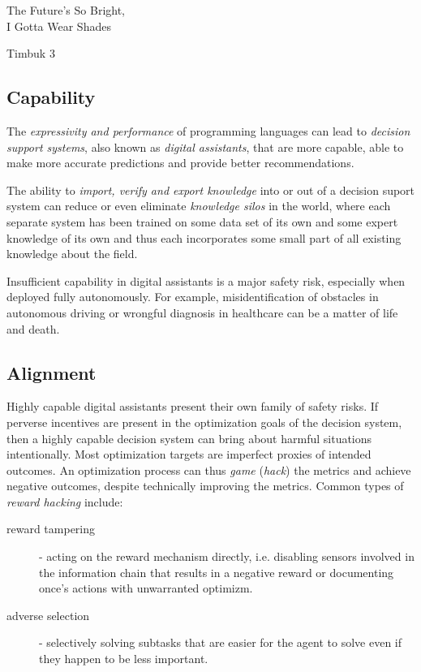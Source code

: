 \epigraph{The Future's So Bright, \\ I Gotta Wear Shades}{Timbuk 3}

\subsection{Capability}

The \emph{expressivity and performance} of programming languages can lead to \emph{decision support systems}, also known as \emph{digital assistants}, that are more capable, able to make more accurate predictions and provide better recommendations.

The ability to \emph{import, verify and export knowledge} into or out of a decision suport system can reduce or even eliminate \emph{knowledge silos} in the world, where each separate system has been trained on some data set of its own and some expert knowledge of its own and thus each incorporates some small part of all existing knowledge about the field. 

Insufficient capability in digital assistants is a major safety risk, especially when deployed fully autonomously. For example, misidentification of obstacles in autonomous driving \cite{sheebajoiceObstacleDetectionSafe2023} or wrongful diagnosis in healthcare \cite{wintersDiagnosticErrorsIntensive2012} can be a matter of life and death.

\subsection{Alignment}

Highly capable digital assistants present their own family of safety risks. 
If perverse incentives are present in the optimization goals of the decision system, then a highly capable decision system can bring about harmful situations intentionally.
Most optimization targets are imperfect proxies of intended outcomes. 
An optimization process can thus \emph{game} (\emph{hack}) the metrics and achieve negative outcomes, despite technically improving the metrics.
Common types of \emph{reward hacking} \cite{skalseDefiningCharacterizingReward2022} include:
\begin{description}
    \item[reward tampering] \cite{everittRewardTamperingProblems2021, skalseInvariancePolicyOptimisation2023} - acting on the reward mechanism directly, i.e. disabling sensors involved in the information chain that results in a negative reward or documenting once's actions with unwarranted optimizm.
    \item[adverse selection] - selectively solving subtasks that are easier for the agent to solve even if they happen to be less important.
\end{description}

